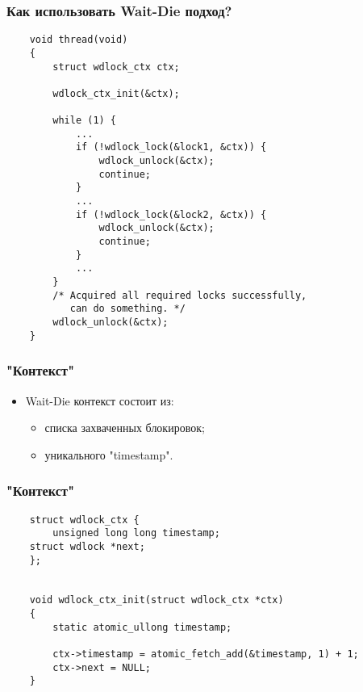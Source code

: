 \begin{frame}[fragile]
\frametitle{Как использовать Wait-Die подход?}
\begin{lstlisting}
    void thread(void)
    {
        struct wdlock_ctx ctx;

        wdlock_ctx_init(&ctx);

        while (1) {
            ...
            if (!wdlock_lock(&lock1, &ctx)) {
                wdlock_unlock(&ctx);
                continue;
            }
            ...
            if (!wdlock_lock(&lock2, &ctx)) {
                wdlock_unlock(&ctx);
                continue;
            }
            ...
        }
        /* Acquired all required locks successfully,
           can do something. */
        wdlock_unlock(&ctx);
    }
\end{lstlisting}
\end{frame}

\begin{frame}
\frametitle{"Контекст"}
\begin{itemize}
    \item<1->Wait-Die контекст состоит из:
    \begin{itemize}
        \item<2->списка захваченных блокировок;
        \item<3->уникального "timestamp".
    \end{itemize}
\end{itemize}
\end{frame}

\begin{frame}[fragile]
\frametitle{"Контекст"}
\begin{lstlisting}
    struct wdlock_ctx {
        unsigned long long timestamp;
	struct wdlock *next;
    };


    void wdlock_ctx_init(struct wdlock_ctx *ctx)
    {
        static atomic_ullong timestamp;

        ctx->timestamp = atomic_fetch_add(&timestamp, 1) + 1;
        ctx->next = NULL;
    }
\end{lstlisting}
\end{frame}

